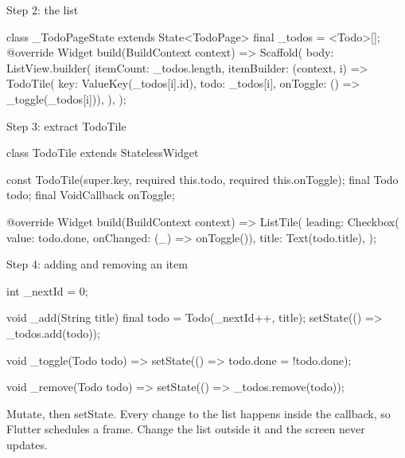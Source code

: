 \documentclass[10pt,aspectratio=169,t]{beamer}
\begin{document}
\begin{frame}[fragile,eyebrow=Worked example]{Step 2: the list}
\begin{dart}
class _TodoPageState extends State<TodoPage> {
  final _todos = <Todo>[];
  @override
  Widget build(BuildContext context) => Scaffold(
        body: ListView.builder(
          itemCount: _todos.length,
          itemBuilder: (context, i) => TodoTile(
              key: ValueKey(_todos[i].id), todo: _todos[i],
              onToggle: () => _toggle(_todos[i])),
        ),
      );
}
\end{dart}
  \vskip 1mm
\end{frame}

\begin{frame}[fragile,eyebrow=Worked example]{Step 3: extract TodoTile}
\begin{dart}
class TodoTile extends StatelessWidget {
  const TodoTile({super.key, required this.todo, required this.onToggle});
  final Todo todo;
  final VoidCallback onToggle;

  @override
  Widget build(BuildContext context) => ListTile(
        leading: Checkbox(
            value: todo.done, onChanged: (_) => onToggle()),
        title: Text(todo.title),
      );
}
\end{dart}
  \vskip 1mm
\end{frame}

\begin{frame}[fragile,eyebrow=Worked example]{Step 4: adding and removing an item}
\begin{dart}
int _nextId = 0;

void _add(String title) {
  final todo = Todo(_nextId++, title);
  setState(() => _todos.add(todo));
}

void _toggle(Todo todo) => setState(() => todo.done = !todo.done);

void _remove(Todo todo) => setState(() => _todos.remove(todo));
\end{dart}
  \begin{takeaway}{Mutate, then setState.}
    Every change to the list happens inside the callback, so Flutter schedules a frame. Change the list outside it and the screen never updates.
  \end{takeaway}
\end{frame}
\end{document}
